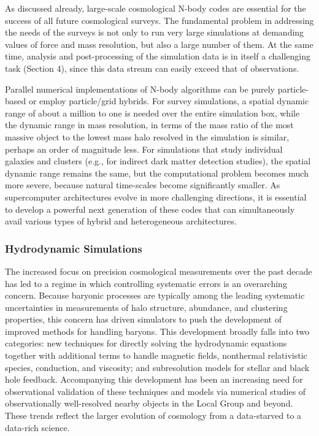 As discussed already, large-scale cosmological N-body codes are
essential for the success of all future cosmological surveys. The
fundamental problem in addressing the needs of the surveys is not only
to run very large simulations at demanding values of force and mass
resolution, but also a large number of them. At the same time,
analysis and post-processing of the simulation data is in itself a
challenging task (Section 4), since this data stream can easily exceed
that of observations.

Parallel numerical implementations of N-body algorithms can be purely
particle-based or employ particle/grid hybrids. For survey
simulations, a spatial dynamic range of about a million to one is
needed over the entire simulation box, while the dynamic range in mass
resolution, in terms of the mass ratio of the most massive object to
the lowest mass halo resolved in the simulation is similar, perhaps an
order of magnitude less. For simulations that study individual
galaxies and clusters (e.g., for indirect dark matter detection
studies), the spatial dynamic range remains the same, but the
computational problem becomes much more severe, because natural
time-scales become significantly smaller. As supercomputer
architectures evolve in more challenging directions, it is essential
to develop a powerful next generation of these codes that can
simultaneously avail various types of hybrid and heterogeneous
architectures.

\subsubsection{Hydrodynamic Simulations}

The increased focus on precision cosmological measurements over the
past decade has led to a regime in which controlling systematic
errors is an overarching concern. Because baryonic processes are
typically among the leading systematic uncertainties in measurements
of halo structure, abundance, and clustering properties, this concern
has driven simulators to push the development of improved methods for
handling baryons. This development broadly falls into two categories:
new techniques for directly solving the hydrodynamic equations
together with additional terms to handle magnetic fields, nonthermal
relativistic species, conduction, and viscosity; and subresolution
models for stellar and black hole feedback. Accompanying this
development has been an increasing need for observational validation
of these techniques and models via numerical studies of
observationally well-resolved nearby objects in the Local Group and
beyond. These trends reflect the larger evolution of cosmology from a
data-starved to a data-rich science.

